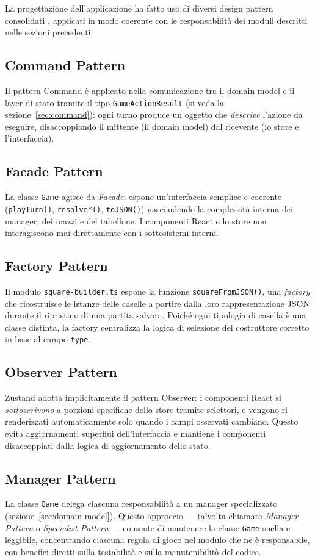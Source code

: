 \documentclass[12pt]{report}
\begin{document}
La progettazione dell'applicazione ha fatto uso di diversi design pattern consolidati \cite{gof1994}, applicati in modo coerente con le responsabilità dei moduli descritti nelle sezioni precedenti.

\subsection{Command Pattern}
Il pattern Command è applicato nella comunicazione tra il domain model e il layer di stato tramite il tipo \texttt{GameActionResult} (si veda la sezione~\ref{sec:command}): ogni turno produce un oggetto che \textit{descrive} l'azione da eseguire, disaccoppiando il mittente (il domain model) dal ricevente (lo store e l'interfaccia).

\subsection{Facade Pattern}
La classe \texttt{Game} agisce da \textit{Facade}: espone un'interfaccia semplice e coerente (\texttt{playTurn()}, \texttt{resolve*()}, \texttt{toJSON()}) nascondendo la complessità interna dei manager, dei mazzi e del tabellone. I componenti React e lo store non interagiscono mai direttamente con i sottosistemi interni.

\subsection{Factory Pattern}
Il modulo \texttt{square-builder.ts} espone la funzione \texttt{squareFromJSON()}, una \textit{factory} che ricostruisce le istanze delle caselle a partire dalla loro rappresentazione JSON durante il ripristino di una partita salvata. Poiché ogni tipologia di casella è una classe distinta, la factory centralizza la logica di selezione del costruttore corretto in base al campo \texttt{type}.

\subsection{Observer Pattern}
Zustand adotta implicitamente il pattern Observer: i componenti React si \textit{sottoscrivono} a porzioni specifiche dello store tramite selettori, e vengono ri-renderizzati automaticamente solo quando i campi osservati cambiano. Questo evita aggiornamenti superflui dell'interfaccia e mantiene i componenti disaccoppiati dalla logica di aggiornamento dello stato.

\subsection{Manager Pattern}
La classe \texttt{Game} delega ciascuna responsabilità a un manager specializzato (sezione~\ref{sec:domain-model}).
Questo approccio --- talvolta chiamato \textit{Manager Pattern} o \textit{Specialist Pattern} --- consente di mantenere la classe \texttt{Game} snella e leggibile, concentrando ciascuna regola di gioco nel modulo che ne è responsabile, con benefici diretti sulla testabilità e sulla manutenibilità del codice.
\end{document}
